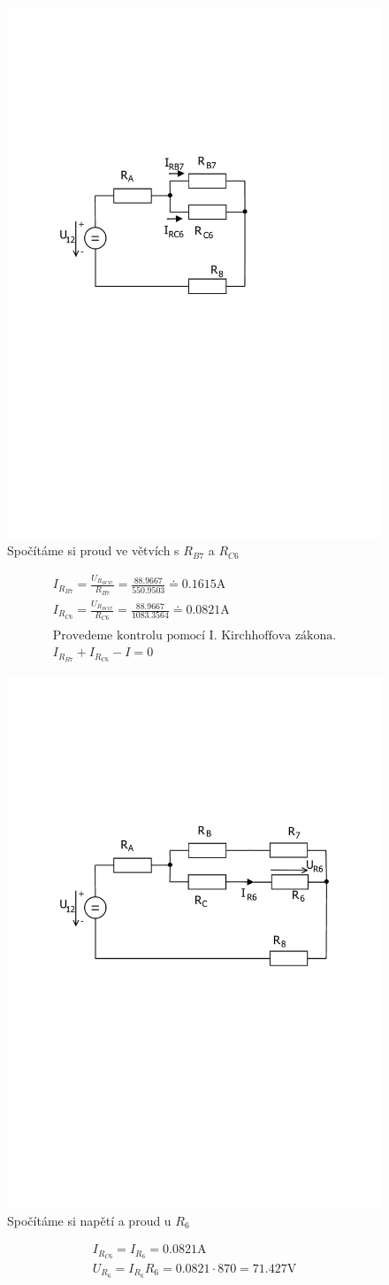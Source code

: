 	\begin{figure}[H]
		\center\includegraphics[width=0.6\linewidth]{obr/1_9}
		\caption{Spočítáme si proud ve větvích s $R_{B7}$ a  $R_{C6}$}
	\end{figure}
	\begin{gather*}
		I_{R_{B7}} = \frac{U_{R_{BC67}}}{R_{B7}} = \frac{88.9667}{550.9503} \doteq 0.1615 \text{A} \\
		I_{R_{C6}} = \frac{U_{R_{BC67}}}{R_{C6}} = \frac{88.9667}{1083.3564} \doteq 0.0821 \text{A} \\
		\\
		\text{Provedeme kontrolu pomocí I. Kirchhoffova zákona.}  \\
		I_{R_{B7}} + I_{R_{C6}} - I  =  0 
	\end{gather*}

	\begin{figure}[H]
		\center\includegraphics[width=0.6\linewidth]{obr/1_10}
		\caption{Spočítáme si napětí a proud u $R_6$}
	\end{figure}
	\begin{gather*}
		I_{R_{C6}} = I_{R_6} = 0.0821 \text{A} \\
		U_{R_6} = {I_{R_6} R_6} = {0.0821 \cdot 870} = 71.427  \text{V} \\
	\end{gather*}
	
